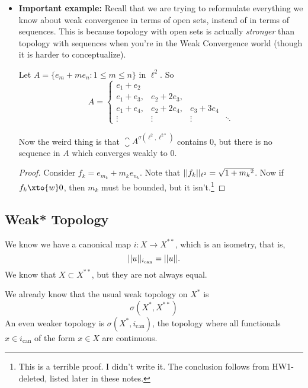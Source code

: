 \documentclass[a5paper]{article}
\theoremstyle{definition}%
\newtheorem*{example*}{Example}
\numberwithin{exercise}{section}
\theoremstyle{remark}%
\begin{document}
\begin{itemize}
\begin{highlight}
\begin{example*}
This means where the weak topology and weak convergence are concerned, we must be thinking of infinite-dimensional vector spaces!
\end{example*}
\end{highlight}

\item \textbf{Important example:} Recall that we are trying to reformulate everything we know about weak convergence in terms of open sets, instead of in terms of sequences. This is because topology with open sets is actually \emph{stronger} than topology with sequences when you're in the Weak Convergence world (though it is harder to conceptualize). 

Let $A=\{e_m+m e_n : 1\leq m\leq n\}$ in $\ell^2$. So 
\[A=
\left\lbrace
\begin{array}{llll}
e_1 + e_2 \\
e_1 + e_3, & e_2 + 2e_3, \\
e_1 + e_4, & e_2 + 2e_4, & e_3 + 3e_4\\
\vdots & \vdots & \vdots & \ddots
\end{array}
\right.
\]

Now the weird thing is that $\closure{A}^{\sigma(\ell^2,\ell^{2*})}$ contains 0, but there is no sequence in $A$ which converges weakly to $0$. 

\begin{proof}
Consider $f_k=e_{m_k}+{m_k} e_{n_k}$. Note that $||f_k||_{\ell^2}=\sqrt{1+{m_k}^2}$. Now if $f_k\xto{w}0$, then $m_k$ must be bounded, but it isn't.\footnote{This is a terrible proof. I didn't write it. The conclusion follows from HW1-deleted, listed later in these notes.}
\end{proof}

\end{itemize}

\pagebreak
\subsection{Weak* Topology}


We know we have a canonical map $i:X\to X^{**}$, which is an isometry, that is, $$||u||_{i_\text{can}}=||u||.$$ We know that $X\subset X^{**}$, but they are not always equal. 

We already know that the usual weak topology on $X^*$ is 
$$\sigma(X^*, X^{**})$$
An even weaker topology is $\sigma(X^*,i_\text{can})$, the topology where all functionals $\hat x \in i_\text{can}$ of the form $x\in X$ are continuous. 
\end{document}
